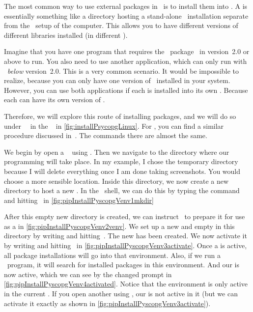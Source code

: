 The most common way to use external packages in \python\ is to install them into .
A  is essentially something like a directory hosting a stand-alone \python\ installation separate from the \python\ setup of the computer.
This allows you to have different versions of different libraries installed (in different ).

Imagine that you have one program that requires the \python\ package \numpy\ in version~2.0 or above to run.
You also need to use another application, which can only run with \numpy\ \emph{below} version~2.0.
This is a very common scenario.
It would be impossible to realize, because you can only have one version of \numpy\ installed in your system.
However, you can use both applications if each is installed into its own .
Because each  can have its own version of \numpy.

Therefore, we will explore this route of installing packages, and we will do so under \ubuntu\ \linux\ in the \bash\  in \cref{fig:installPsycopgLinux}.
For \microsoftWindows, you can find a similar procedure discussed in~\cite{programmingWithPython}.
The commands there are almost the same.

We begin by open a \bash\  using \ubuntuTerminal.
Then we navigate to the directory where our programming will take place.
In my example, I chose the temporary directory  because I will delete everything once I am done taking screenshots.
You would choose a more sensible location.
Inside this directory, we now create a new directory  to host a new .
In the \bash\ shell, we can do this by typing the command  and hitting~\keys{\enter} in \cref{fig:pipInstallPyscopgVenv1mkdir}

After this empty new directory is created, we can instruct \python\ to prepare it for use as a  in \cref{fig:pipInstallPyscopgVenv2venv}.
We set up a new and empty  in this directory by writing  and hitting~\keys{\enter}.
The new  has been created.
We now activate it by writing  and hitting~\keys{\enter} in \cref{fig:pipInstallPyscopgVenv3activate}.
Once a  is active, all package installations will go into that environment.
Also, if we run a \python\ program, it will search for installed packages in this environment.
And our   is now active, which we can see by the changed prompt in \cref{fig:pipInstallPyscopgVenv4activated}.
Notice that the environment is only active in the current .
If you open another  using \ubuntuTerminal, our  is not active in it (but we can activate it exactly as shown in \cref{fig:pipInstallPyscopgVenv3activate}).

